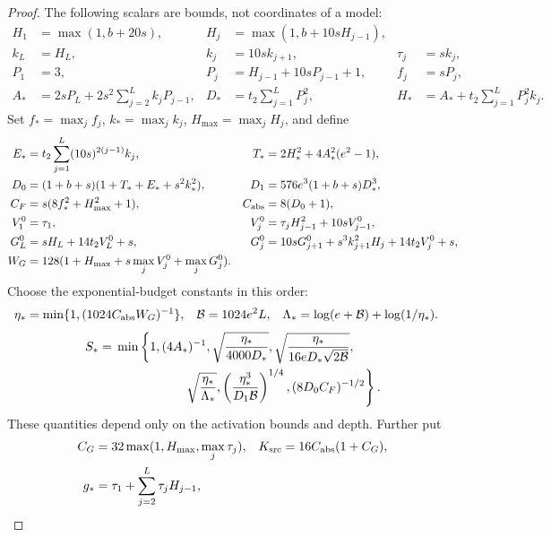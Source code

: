 \begin{proof}
The following scalars are bounds, not coordinates of a model:
\begin{align}
 H_1&=\max(1,b+20s),& H_j&=\max(1,b+10sH_{j-1}),\nonumber\\
 k_L&=H_L,& k_j&=10sk_{j+1},& \tau_j&=sk_j,\nonumber\\
 P_1&=3,&P_j&=H_{j-1}+10sP_{j-1}+1,&f_j&=sP_j,\nonumber\\
 A_*&=2sP_L+2s^2\sum_{j=2}^Lk_jP_{j-1},&
 D_*&=t_2\sum_{j=1}^LP_j^2,&
 H_*&=A_*+t_2\sum_{j=1}^LP_j^2k_j. \label{cp:src-basic}
\end{align}
Set \(f_* =\max_jf_j\), \(k_* =\max_jk_j\),
\(H_{\max}=\max_jH_j\), and define
\begin{align}
 E_*&=t_2\sum_{j=1}^L(10s)^{2(j-1)}k_j,&
 T_*&=2H_*^2+4A_*^2(e^2-1),\nonumber\\
 D_0&=(1+b+s)(1+T_*+E_*+s^2k_*^2),&
 D_1&=576e^3(1+b+s)D_*^3,\nonumber\\
 C_F&=s(8f_*^2+H_{\max}^2+1),&
 C_{\rm abs}&=8(D_0+1),\nonumber\\
 V_1^0&=\tau_1,&V_j^0&=\tau_jH_{j-1}^2+10sV_{j-1}^0,\nonumber\\
 G_L^0&=sH_L+14t_2V_L^0+s,&
 G_j^0&=10sG_{j+1}^0+s^3k_{j+1}^2H_j+14t_2V_j^0+s,\nonumber\\
 W_G&=128(1+H_{\max}+s\max_jV_j^0+\max_jG_j^0).
 \label{cp:src-absorption-coefficients}
\end{align}
Choose the exponential-budget constants in this order:
\begin{align}
 \eta_*&=\min\{1,(1024C_{\rm abs}W_G)^{-1}\},&
 \mathcal B&=1024e^2L,&
 \Lambda_*&=\log(e+\mathcal B)+\log(1/\eta_*).\nonumber
\end{align}
\begin{equation}
\begin{split}
 S_*={}&\min\left\{1,(4A_*)^{-1},
 \sqrt{\frac{\eta_*}{4000D_*}},
 \sqrt{\frac{\eta_*}{16eD_*\sqrt{2\mathcal B}}},\right.\\
 &\hspace{19mm}\left.\sqrt{\frac{\eta_*}{\Lambda_*}},
 \left(\frac{\eta_*^3}{D_1\mathcal B}\right)^{1/4},
 (8D_0C_F)^{-1/2}\right\}. \label{cp:src-allowance}
\end{split}
\end{equation}
These quantities depend only on the activation bounds and depth.
Further put
\begin{align}
 C_G&=32\max(1,H_{\max},\max_j\tau_j),&
 K_{\rm src}&=16C_{\rm abs}(1+C_G),\nonumber\\
 g_*&=\tau_1+\sum_{j=2}^L\tau_jH_{j-1},&

\end{align}
\end{proof}
